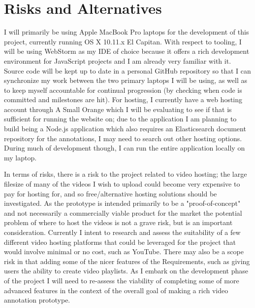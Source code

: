 %
\chapter{Risks and Alternatives}
\label{sec:risksandalternatives}






I will primarily be using Apple MacBook Pro laptops for the development of this project, currently running OS X 10.11.x El Capitan.  With respect to tooling, I will be using WebStorm as my IDE of choice because it offers a rich development environment for JavaScript projects and I am already very familiar with it.  Source code will be kept up to date in a personal GitHub repository so that I can synchronize my work between the two primary laptops I will be using, as well as to keep myself accountable for continual progression (by checking when code is committed and milestones are hit).  For hosting, I currently have a web hosting account through A Small Orange which I will be evaluating to see if that is sufficient for running the website on; due to the application I am planning to build being a Node.js application which also requires an Elasticsearch document repository for the annotations, I may need to search out other hosting options.  During much of development though, I can run the entire application locally on my laptop.

In terms of risks, there is a risk to the project related to video hosting; the large filesize of many of the videos I wish to upload could become very expensive to pay for hosting for, and so free/alternative hosting solutions should be investigated.  As the prototype is intended primarily to be a "proof-of-concept" and not necessarily a commercially viable product for the market the potential problem of where to host the videos is not a grave risk, but is an important consideration.  Currently I intent to research and assess the suitability of a few different video hosting platforms that could be leveraged for the project that would involve minimal or no cost, such as YouTube.  There may also be a scope risk in that adding some of the nicer features of the Requirements, such as giving users the ability to create video playlists.  As I embark on the development phase of the project I will need to re-assess the viability of completing some of more advanced features in the context of the overall goal of making a rich video annotation prototype.






